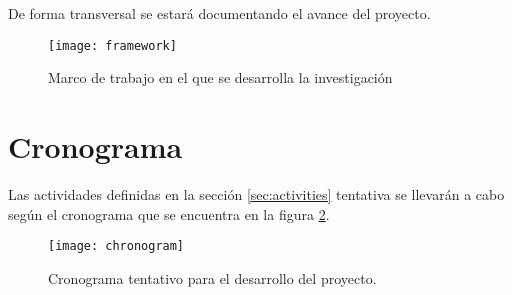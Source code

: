 De forma transversal se estará documentando el avance del proyecto.

\begin{figure}[h]
    \centering
    \texttt{[image: framework]}
    \caption{Marco de trabajo en el que se desarrolla la investigación}
    \label{fig:framework}
\end{figure}

\section{Cronograma}
Las actividades definidas en la sección \ref{sec:activities} tentativa se llevarán a cabo según el cronograma que se encuentra en la figura \ref{fig:chronogram}.

\begin{figure}
    \centering
    \texttt{[image: chronogram]}
    \caption{Cronograma tentativo para el desarrollo del proyecto.}
    \label{fig:chronogram}
\end{figure}
